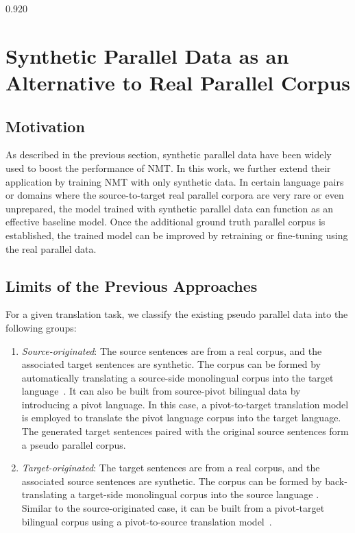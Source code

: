 \documentclass[11pt,letterpaper]{article}
\newcommand{\mylinespacing}{0.920}
\begin{document}
\begin{spacing}{\mylinespacing}
\section{Synthetic Parallel Data as an Alternative to Real Parallel Corpus}

\subsection{Motivation}
As described in the previous section, synthetic parallel data have been widely used to boost the performance of NMT. In this work, we further extend their application by training NMT with only synthetic data. In certain language pairs or domains where the source-to-target real parallel corpora are very rare or even unprepared, the model trained with synthetic parallel data can function as an effective baseline model. Once the additional ground truth parallel corpus is established, the trained model can be improved by retraining or fine-tuning using the real parallel data.

\subsection{Limits of the Previous Approaches}
For a given translation task, we classify the existing pseudo parallel data into the following groups:

\begin{enumerate}[label=(\alph*)]

\item \textit{Source-originated}: The source sentences are from a real corpus, and the associated target sentences are synthetic. The corpus can be formed by automatically translating a source-side monolingual corpus into the target language~\cite{zhang2016bridging,zhang2016exploiting}. It can also be built from source-pivot bilingual data by introducing a pivot language. In this case, a pivot-to-target translation model is employed to translate the pivot language corpus into the target language. The generated target sentences paired with the original source sentences form a pseudo parallel corpus.

\item \textit{Target-originated}: The target sentences are from a real corpus, and the associated source sentences are synthetic. The corpus can be formed by back-translating a target-side monolingual corpus into the source language \cite{sennrich2015improving}. Similar to the source-originated case, it can be built from a pivot-target bilingual corpus using a pivot-to-source translation model~\cite{firat2016zero}.


\end{enumerate}
\end{spacing}
\end{document}
